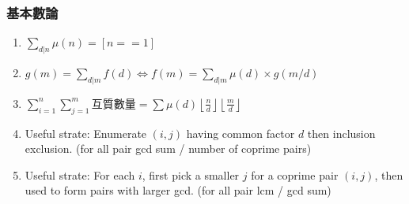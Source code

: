 \subsubsection{基本數論}
\begin{enumerate}\itemsep = -3pt
	\item $\sum_{d|n} \mu (n)=[n==1]$
	\item $g(m)=\sum_{d|m}f(d)\Leftrightarrow f(m)=\sum_{d|m}\mu (d) \times g(m/d)$
	\item $\sum_{i=1}^n\sum_{j=1}^m$互質數量$=\sum \mu (d)\left \lfloor \frac{n}{d} \right \rfloor \left \lfloor \frac{m}{d} \right \rfloor$
	\item Useful strate: Enumerate $(i, j)$ having common factor $d$ then inclusion exclusion. (for all pair gcd sum / number of coprime pairs)
	\item Useful strate: For each $i$, first pick a smaller $j$ for a coprime pair $(i, j)$, then used to form pairs with larger gcd. (for all pair lcm / gcd sum)
\end{enumerate}

